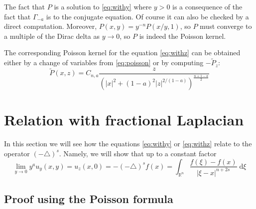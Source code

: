 \documentclass[letterpaper]{article}
\numberwithin{equation}{section}
\newcommand{\abs}[1]{\left\vert#1\right\vert}
\newcommand{\R}{\mathbb R}
\newcommand{\lap} {\triangle}
\newcommand{\dd} {\; \mathrm{d}}
\newcommand{\party}[1] {#1_y}
\newcommand{\partz}[1] {#1_z}
\begin{document}
The fact that $P$ is a solution to \eqref{eq:withy} where $y>0$ is a consequence of the fact that $\Gamma_{-a}$ is to the conjugate equation. Of course it can also be checked by a direct computation. Moreover, $P(x,y) = y^{-n} P(x/y,1)$, so $P$ must converge to a multiple of the Dirac delta as $y \to 0$, so $P$ is indeed the Poisson kernel.

The corresponding Poisson kernel for the equation \eqref{eq:withz} can be obtained either by a change of variables from \eqref{eq:poisson} or by computing $-\tilde P_z$:
\begin{equation}
\tilde P(x,z) = %
C_{n,a} \frac{z}{\left(\abs{x}^2 + (1-a)^2 \abs{z}^{2/(1-a)} \right)^{\frac{n+1-a}{2}}}
\end{equation}


\section{Relation with fractional Laplacian}
In this section we will see how the equations \eqref{eq:withy} or \eqref{eq:withz} relate to the operator $(-\lap)^s$. Namely, we will show that up to a constant factor
\begin{equation} \label{eq:identities}
 \lim_{y \to 0} y^a \party u(x,y) = \partz u(x,0) = -(-\lap)^s f(x) = \int_{\R^n} \frac{ f(\xi) - f(x) }{\abs{\xi-x}^{n+2s}} \dd \xi
\end{equation}

\subsection{Proof using the Poisson formula}
\end{document}
